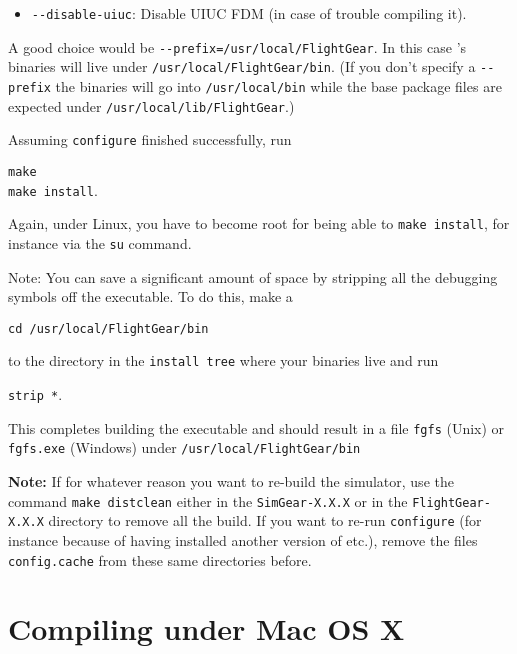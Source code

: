 \begin{enumerate}
\begin{itemize}
\item{\texttt{-$ $-disable-uiuc}}: Disable UIUC FDM (in case of trouble compiling it).
\end{itemize}

A good choice would be \texttt{-$ $-prefix=/usr/local/FlightGear}. In this case
\FlightGear{}'s binaries will live under
\texttt{/usr/local/FlightGear/bin}. (If you don't specify a \texttt{-$ $-prefix} the binaries will go into
\texttt{/usr/local/bin} while the base package files are expected under
\texttt{/usr/local/lib/FlightGear}.)

Assuming \texttt{configure} finished successfully, run
 \medskip

        \texttt{make}\\
        \texttt{make install}.

 \noindent
 Again, under Linux, you have to become root for being able to \texttt{make
install}, for instance via the \texttt{su} command.

 \noindent
 Note:  You can save a significant amount of space by stripping all the
    debugging symbols off the executable.  To do this, make a
     \medskip

    \texttt{cd /usr/local/FlightGear/bin}

 \noindent
    to the directory in the \texttt{install tree} where your binaries live and run
     \medskip

    \texttt{strip *}.
  \end{enumerate}


 This completes building the executable and should result in a file \texttt{fgfs} (Unix) or
 \texttt{fgfs.exe} (Windows) under \texttt{/usr/local/FlightGear/bin}

\textbf{Note:} If for whatever reason you want to re-build the simulator, use the command
\texttt{make distclean} either in the \texttt{SimGear-X.X.X} or in the
\texttt{FlightGear-X.X.X} directory to remove all the build. If you want to re-run
\texttt{configure} (for instance because of having installed another version of \PLIB{}
etc.), remove the files \texttt{config.cache} from these same directories before.

\section{Compiling \FlightGear{} under Mac OS X }


